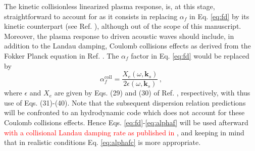 \documentclass[
 reprint,
 amsmath,amssymb,
 aps,
]{revtex4-1}
\def\tc{\textcolor{red}}
\begin{document}
The kinetic collisionless linearized plasma response, is, at this stage,  straightforward to account for as it consists in replacing  $\alpha_f $ in Eq. \eqref{eq:fd} by its kinetic counterpart (see  Ref. \cite[]{Ruyer_FSBS}), although out of the scope of this manuscript. 
Moreover,   the plasma response to driven acoustic waves should include, in addition to the Landau damping, Coulomb collisions effects as derived from the Fokker Planck equation in Ref. \cite[]{POP_Berger_2005}. The  $\alpha_f $ factor in Eq. \eqref{eq:fd}  would be replaced by 
\begin{equation}
    \alpha_f^\mathrm{coll} = \frac{X_e(\omega,\mathbf{k}_s)}{2\epsilon(\omega,\mathbf{k}_s)} \, , \label{eq:alphafc}
\end{equation}
where $\epsilon$ and $X_e$ are given by Eqs. (29) and (30) of Ref. \cite[]{POP_Berger_2005}, respectively,  with thus use of Eqs. (31)-(40).
Note that the subsequent dispersion relation predictions will be confronted to an hydrodynamic code  which does not account for these Coulomb collisions effects. Hence Eqs. \eqref{eq:fd}-\eqref{eq:alphaf} will be used afterward \tc{with a collisional Landau damping rate as published in \cite[]{casanova_1989}}, and keeping in mind that in realistic conditions Eq. \eqref{eq:alphafc} is more appropriate. 
\end{document}
